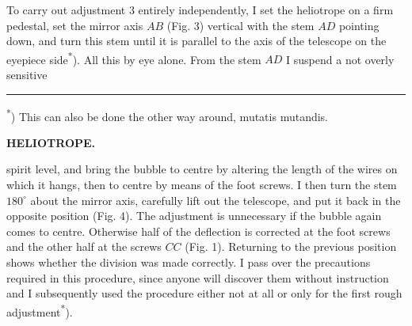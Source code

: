 \par\noindent\hspace*{\parindent}To carry out adjustment 3 entirely independently, I set the heliotrope on a firm pedestal, set the mirror axis $AB$ (Fig. 3) vertical with the stem $AD$ pointing down, and turn this stem until it is parallel to the axis of the telescope on the eyepiece side\textsuperscript{*}). All this by eye alone. From the stem $AD$ I suspend a not overly sensitive
\par\medskip\noindent\rule{4cm}{.4pt}\par
\begingroup\footnotesize\noindent\hspace*{\parindent}\textsuperscript{*}) This can also be done the other way around, mutatis mutandis.\par\endgroup

\par\clearpage
\noindent\null\hfill{\small\textbf{HELIOTROPE.}}\hfill{}\par\medskip
\noindent spirit level, and bring the bubble  to centre by altering the length of the wires on which it hangs, then  to centre by means of the foot screws. I then turn the stem $180^\circ$ about the mirror axis, carefully lift out the telescope, and put it back in the opposite position (Fig. 4). The adjustment is unnecessary if the bubble again comes to centre. Otherwise half of the deflection is corrected at the foot screws and the other half at the screws $CC$ (Fig. 1). Returning to the previous position shows whether the division was made correctly. I pass over the precautions required in this procedure, since anyone will discover them without instruction and I subsequently used the procedure either not at all or only for the first rough adjustment\textsuperscript{*}).

